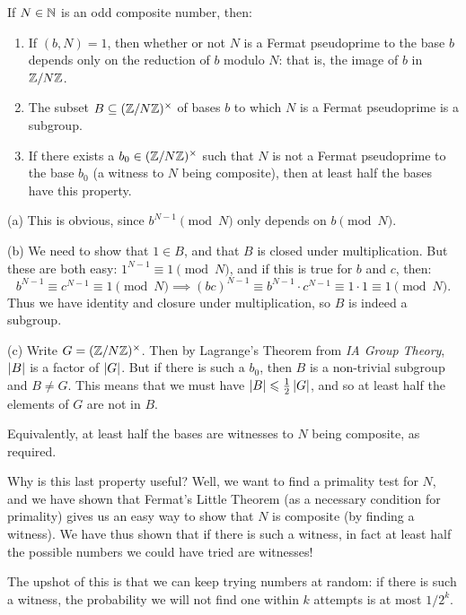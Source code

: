 \documentclass{article}
\begin{document}
\begin{proposition}
	\label{proposition-on-fermat-pseudoprimes}
    If $N \in \mathbb{N}$ is an odd composite number, then:
    \begin{enumerate}
	    \item[(a)] If $(b, N) = 1$, then whether or not $N$ is a Fermat pseudoprime to the base $b$ depends only on the reduction of $b$ modulo $N$: that is, the image of $b$ in $\mathbb{Z}/N\mathbb{Z}$.
	    \item[(b)] The subset $B \subseteq (\mathbb{Z}/N\mathbb{Z})^\times$ of bases $b$ to which $N$ is a Fermat pseudoprime is a subgroup.
	    \item[(c)] If there exists a $b_0 \in (\mathbb{Z}/N\mathbb{Z})^\times$ such that $N$ is not a Fermat pseudoprime to the base $b_0$ (a witness to $N$ being composite), then at least half the bases have this property.
	\end{enumerate}
\end{proposition}

\begin{prf}
    (a) This is obvious, since $b^{N-1} \pmod N$ only depends on $b \pmod N$.
    
    (b) We need to show that $1 \in B$, and that $B$ is closed under multiplication. But these are both easy: $1^{N-1} \equiv 1 \pmod N$, and if this is true for $b$ and $c$, then:
    \[
    b^{N-1} \equiv c^{N-1} \equiv 1 \pmod N \implies
	(bc)^{N-1} \equiv b^{N-1} \cdot c^{N-1} \equiv 1 \cdot 1 \equiv 1 \pmod N.
	\]
	Thus we have identity and closure under multiplication, so $B$ is indeed a subgroup.
	
	(c) Write $G = (\mathbb{Z}/N\mathbb{Z})^\times$. Then by Lagrange's Theorem from \textit{IA Group Theory}, $\left\lvert B \right\rvert$ is a factor of $\left\lvert G \right\rvert$. But if there is such a $b_0$, then $B$ is a non-trivial subgroup and $B \neq G$. This means that we must have $\left\lvert B \right\rvert \leqslant \frac{1}{2} \left\lvert G \right\rvert$, and so at least half the elements of $G$ are not in $B$.
	
	Equivalently, at least half the bases are witnesses to $N$ being composite, as required.
\end{prf}

Why is this last property useful? Well, we want to find a primality test for $N$, and we have shown that Fermat's Little Theorem (as a necessary condition for primality) gives us an easy way to show that $N$ is composite (by finding a witness). We have thus shown that if there is such a witness, in fact at least half the possible numbers we could have tried are witnesses!

The upshot of this is that we can keep trying numbers at random: if there is such a witness, the probability we will not find one within $k$ attempts is at most $1/2^k$.
\end{document}

